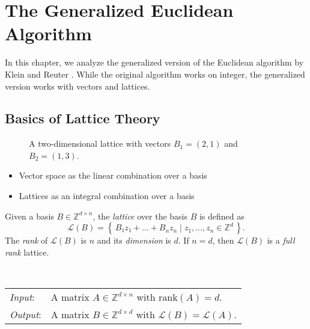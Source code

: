 \chapter{The Generalized Euclidean Algorithm}

In this chapter, we analyze the generalized version of the Euclidean algorithm
by Klein and Reuter \cite{Klein24}.
While the original algorithm works on integer,
the generalized version works with vectors and lattices.

\section{Basics of Lattice Theory}

\begin{figure}[b]
  \centering
  
  \caption{A two-dimensional lattice with vectors $B_1 = (2, 1)$ and $B_2 = (1, 3)$.}
\end{figure}

\begin{itemize}
  \item Vector space as the linear combination over a basis
  \item Lattices as an integral combination over a basis
\end{itemize}

\begin{definition}
  Given a basis $B ∈ ℤ^{d × n}$, the \emph{lattice} over the basis $B$ is defined as
  \[
    \mathcal{L}(B) = \left\{\, B₁z₁ + \dots + B_n z_n \mid z_1, \dots, z_n ∈ ℤ^d \,\right\}.
  \]
  The \emph{rank} of $\mathcal{L}(B)$ is $n$ and its \emph{dimension} is $d$.
  If $n = d$, then $\mathcal{L}(B)$ is a \emph{full rank} lattice.
\end{definition}

\begin{problem}~\\
  \begin{tabular}{l p{9cm}}
    \emph{Input}: & A matrix $A ∈ ℤ^{d × n}$ with $\text{rank}(A) = d$. \\
    \emph{Output}: & A matrix $B ∈ ℤ^{d × d}$ with $\mathcal{L}(B) = \mathcal{L}(A)$. \\
  \end{tabular}
\end{problem}

